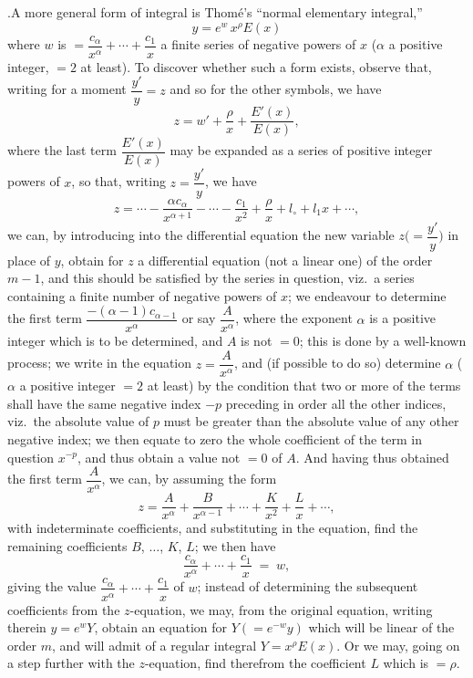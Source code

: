 \documentclass[11pt]{article}
\begin{document}
.\quad A more general form of integral is Thom\'e's ``normal elementary integral,''
\[
y = e^{w}\,x^{\rho}E(x)
\]
where $w$ is $= \dfrac{c_{\alpha}}{x^{\alpha}} + \dotsb + \dfrac{c_1}{x}$ a finite series of negative powers of $x$ ($\alpha$ a positive integer, $=2$ at least). To discover whether such a form exists, observe that, writing for a moment $\dfrac{y'}{y} = z$ and so for the other symbols, we have
\[
z = w' + \frac{\rho}{x} + \frac{E'(x)}{E(x)},
\]
where the last term $\dfrac{E'(x)}{E(x)}$ may be expanded as a series of positive integer powers of $x$, so that, writing $z = \dfrac{y'}{y}$, we have
\[
z = \dotsb - \frac{\alpha c_{\alpha}}{x^{\alpha+1}} - \dotsb - \frac{c_1}{x^2} + \frac{\rho}{x} + l_{\circ} + l_1 x + \dotsb,
\]
we can, by introducing into the differential equation the new variable $z\bigl(=\dfrac{y'}{y}\bigr)$ in place of $y$, obtain for $z$ a differential equation (not a linear one) of the order $m-1$, and this should be satisfied by the series in question, viz.\ a series containing a finite number of negative powers of $x$; we endeavour to determine the first term $\dfrac{-(\alpha-1)c_{\alpha-1}}{x^{\alpha}}$ or say $\dfrac{A}{x^{\alpha}}$, where the exponent $\alpha$ is a positive integer which is to be determined, and $A$ is not $=0$; this is done by a well-known process; we write in the equation $z = \dfrac{A}{x^{\alpha}}$, and (if possible to do so) determine $\alpha$ ($\alpha$ a positive integer $=2$ at least) by the condition that two or more of the terms shall have the same negative index $-p$ preceding in order all the other indices, viz.\ the absolute value of $p$ must be greater than the absolute value of any other negative index; we then equate to zero the whole coefficient of the term in question $x^{-p}$, and thus obtain a value not $=0$ of $A$. And having thus obtained the first term $\dfrac{A}{x^{\alpha}}$, we can, by assuming the form
\[
z = \frac{A}{x^{\alpha}} + \frac{B}{x^{\alpha-1}} + \dotsb + \frac{K}{x^2} + \frac{L}{x} + \dotsb,
\]
with indeterminate coefficients, and substituting in the equation, find the remaining coefficients $B$, $\dotsc$, $K$, $L$; we then have
\[
\frac{c_{\alpha}}{x^{\alpha}} + \dotsb + \frac{c_1}{x} \;=\; w,
\]
giving the value $\dfrac{c_{\alpha}}{x^{\alpha}} + \dotsb + \dfrac{c_1}{x}$ of $w$; instead of determining the subsequent coefficients from the $z$-equation, we may, from the original equation, writing therein $y = e^{w}Y$, obtain an equation for $Y(=e^{-w}y)$ which will be linear of the order $m$, and will admit of a regular integral $Y = x^{\rho}E(x)$. Or we may, going on a step further with the $z$-equation, find therefrom the coefficient $L$ which is $=\rho$.
\end{document}
